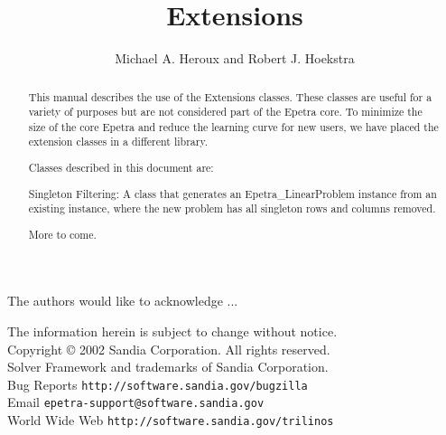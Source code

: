\documentclass[11pt,twoside,titlepage]{EpetraDoc}
\title{\Epetra{} Extensions}
\author{Michael A. Heroux and Robert J. Hoekstra}
\begin{document}

\maketitle


\begin{abstract}

This manual describes the use of the \Epetra{} Extensions classes.  These classes
are useful for a variety of purposes but are not considered part of the Epetra core.
To minimize the size of the core Epetra and reduce the learning curve for new users,
we have placed the extension classes in a different library.

Classes described in this document are:
\begin{EpetraItemize}

\item Singleton Filtering:  A class that generates an Epetra\_LinearProblem instance
from an existing instance, where the new problem has all singleton rows and columns
removed.
\item More to come.

\end{EpetraItemize}

\end{abstract}

\clearpage
{}
The authors would like to acknowledge ...

The information herein is subject to change without notice.\\[1em]
Copyright \copyright{} 2002 Sandia Corporation.  All rights reserved.\\[1em]
\EpetraTM{} Solver Framework and \EpetraTM{} trademarks of Sandia
Corporation.\\[1em]

\label{Contacts}
Bug Reports \hfill \texttt{http://software.sandia.gov/bugzilla} \\
Email \hfill \texttt{epetra-support@software.sandia.gov} \\
World Wide Web \hfill \texttt{http://software.sandia.gov/trilinos}
\end{document}
